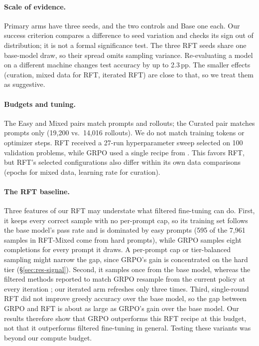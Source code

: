 \documentclass{article}
\begin{document}
\paragraph{Scale of evidence.} Primary arms have three seeds, and the two controls and Base one each. Our success criterion compares a difference to seed variation and checks its sign out of distribution; it is not a formal significance test. The three RFT seeds share one base-model draw, so their spread omits sampling variance. Re-evaluating a model on a different machine changes test accuracy by up to 2.3\,pp. The smaller effects (curation, mixed data for RFT, iterated RFT) are close to that, so we treat them as suggestive.

\paragraph{Budgets and tuning.} The Easy and Mixed pairs match prompts and rollouts; the Curated pair matches prompts only (19{,}200 vs.\ 14{,}016 rollouts). We do not match training tokens or optimizer steps. RFT received a 27-run hyperparameter sweep selected on 100 validation problems, while GRPO used a single recipe from \citet{bauer2026}. This favors RFT, but RFT's selected configurations also differ within its own data comparisons (epochs for mixed data, learning rate for curation).

\paragraph{The RFT baseline.} Three features of our RFT may understate what filtered fine-tuning can do. First, it keeps every correct sample with no per-prompt cap, so its training set follows the base model's pass rate and is dominated by easy prompts (595 of the 7{,}961 samples in RFT-Mixed come from hard prompts), while GRPO samples eight completions for every prompt it draws. A per-prompt cap or tier-balanced sampling might narrow the gap, since GRPO's gain is concentrated on the hard tier (\S\ref{sec:res-signal}). Second, it samples once from the base model, whereas the filtered methods reported to match GRPO resample from the current policy at every iteration \citep{xiong2025minimalist,samineni2025rl}; our iterated arm refreshes only three times. Third, single-round RFT did not improve greedy accuracy over the base model, so the gap between GRPO and RFT is about as large as GRPO's gain over the base model. Our results therefore show that GRPO outperforms this RFT recipe at this budget, not that it outperforms filtered fine-tuning in general. Testing these variants was beyond our compute budget.
\end{document}
